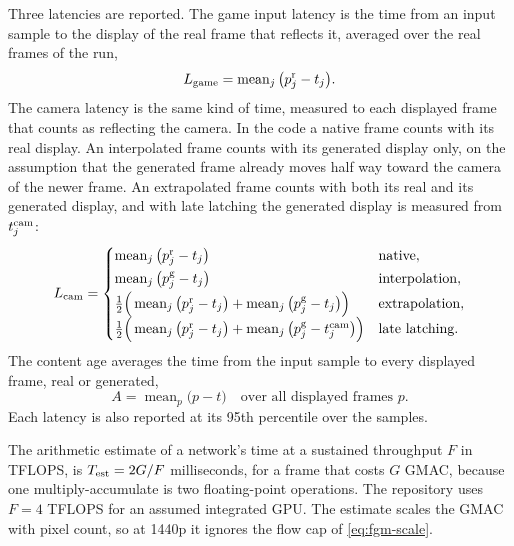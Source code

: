 Three latencies are reported. The game input latency is the time from an input sample to the display of the real frame that reflects it, averaged over the real frames of the run,
\begin{equation}
L_{\rm game}=\operatorname{mean}_j\big(p^{\rm r}_j-t_j\big).\label{eq:fgm-lat-game}
\end{equation}
The camera latency is the same kind of time, measured to each displayed frame that counts as reflecting the camera. In the code a native frame counts with its real display. An interpolated frame counts with its generated display only, on the assumption that the generated frame already moves half way toward the camera of the newer frame. An extrapolated frame counts with both its real and its generated display, and with late latching the generated display is measured from $t^{\rm cam}_j$:
\begin{equation}
L_{\rm cam}=\begin{cases}\operatorname{mean}_j\big(p^{\rm r}_j-t_j\big) & \text{native},\\[2pt] \operatorname{mean}_j\big(p^{\rm g}_j-t_j\big) & \text{interpolation},\\[2pt] \tfrac12\Big(\operatorname{mean}_j\big(p^{\rm r}_j-t_j\big)+\operatorname{mean}_j\big(p^{\rm g}_j-t_j\big)\Big) & \text{extrapolation},\\[2pt] \tfrac12\Big(\operatorname{mean}_j\big(p^{\rm r}_j-t_j\big)+\operatorname{mean}_j\big(p^{\rm g}_j-t^{\rm cam}_j\big)\Big) & \text{late latching.}\end{cases}\label{eq:fgm-lat-cam}
\end{equation}
The content age averages the time from the input sample to every displayed frame, real or generated,
\begin{equation}
A=\operatorname{mean}_p\big(p-t\big)\quad\text{over all displayed frames }p.\label{eq:fgm-lat-age}
\end{equation}
Each latency is also reported at its 95th percentile over the samples.

The arithmetic estimate of a network's time at a sustained throughput $F$ in TFLOPS, is $T_{\rm est}=2G/F$ milliseconds, for a frame that costs $G$ GMAC, because one multiply-accumulate is two floating-point operations. The repository uses $F=4$ TFLOPS for an assumed integrated GPU. The estimate scales the GMAC with pixel count, so at 1440p it ignores the flow cap of \cref{eq:fgm-scale}.

